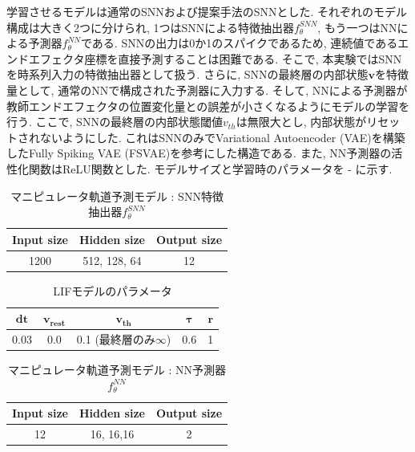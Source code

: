 学習させるモデルは通常のSNNおよび提案手法のSNNとした.
それぞれのモデル構成は大きく2つに分けられ, 1つはSNNによる特徴抽出器$f_{\theta}^{SNN}$, もう一つはNNによる予測器$f_{\theta}^{NN}$である.
SNNの出力は0か1のスパイクであるため, 連続値であるエンドエフェクタ座標を直接予測することは困難である.
そこで, 本実験ではSNNを時系列入力の特徴抽出器として扱う.
さらに, SNNの最終層の内部状態$\bm{v}$を特徴量として, 通常のNNで構成された予測器に入力する.
そして, NNによる予測器が教師エンドエフェクタの位置変化量との誤差が小さくなるようにモデルの学習を行う.
ここで, SNNの最終層の内部状態閾値$v_{th}$は無限大とし, 内部状態がリセットされないようにした.
これはSNNのみでVariational Autoencoder (VAE)を構築したFully Spiking VAE (FSVAE)\cite{fsvae}を参考にした構造である.
また, NN予測器の活性化関数はReLU関数とした.
モデルサイズと学習時のパラメータを - に示す.
\begin{table}[htb] %
    \centering
    \caption{マニピュレータ軌道予測モデル : SNN特徴抽出器$f_{\theta}^{SNN}$}
    \label{tab:exp3:model:snn}
    \begin{tabular}{ccc}
        \hline
        \textbf{Input size}& \textbf{Hidden size} & \textbf{Output size}\\
        \hline
        1200   & 512, 128, 64 & 12 \\
        \hline
    \end{tabular}
\end{table}

\begin{table}[htb]
    \centering
    \caption{LIFモデルのパラメータ}
    \label{tab:exp3:model:parameter:lif}
    \begin{tabular}{ccccc}
        \hline
        $\bm{dt}$& $\bm{v_{rest}}$ & $\bm{v_{th}}$ & $\bm{\tau}$ & $\bm{r}$\\
        \hline
        0.03   & 0.0 & 0.1 (最終層のみ$\infty$) & 0.6 & 1 \\
        \hline
    \end{tabular}
\end{table}

\begin{table}[htb] %
    \centering
    \caption{マニピュレータ軌道予測モデル : NN予測器$f_{\theta}^{NN}$}
    \label{tab:exp3:model:nn}
    \begin{tabular}{ccc}
        \hline
        \textbf{Input size}& \textbf{Hidden size} & \textbf{Output size}\\
        \hline
        12   & 16, 16,16 & 2 \\
        \hline
    \end{tabular}
\end{table}

